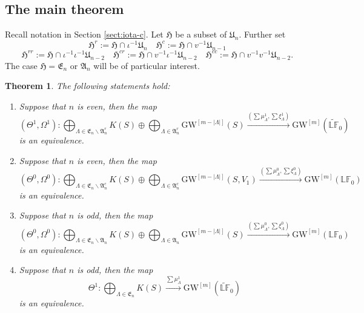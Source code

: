 \documentclass[a4paper]{amsart}
\theoremstyle{plain}
\newtheorem{theorem}{Theorem}[section]
\theoremstyle{definition}
\numberwithin{equation}{section}
\newcommand{\GW}{\mathrm{GW}}
\newcommand{\LFb}{\mathbb{LF}}
\begin{document}
\subsection{The main theorem}
Recall notation in Section \ref{sect:iota-c}. Let $\mathfrak{H}$ be a subset of $\mathfrak{U}_n$. Further set
\[\mathfrak{H}^r :=\mathfrak{H}\cap \iota^{-1}\mathfrak{U}_n  \quad \mathfrak{H}^c :=  \mathfrak{H} \cap v^{-1}\mathfrak{U}_{n-1}  \]
\[ \mathfrak{H}^{rr} :=\mathfrak{H}\cap \iota^{-1}\iota^{-1}\mathfrak{U}_{n-2} \quad \mathfrak{H}^{cr} :=\mathfrak{H}\cap v^{-1}\iota^{-1}\mathfrak{U}_{n-2} \quad \mathfrak{H}^{cc} :=\mathfrak{H}\cap v^{-1}v^{-1}\mathfrak{U}_{n-2}. \]
The case $\mathfrak{H}= \mathfrak{E}_{n}$ or $\mathfrak{A}_n$ will be of particular interest.
\begin{theorem}\label{thm:main-theo} The following statements hold:
    \begin{enumerate}[leftmargin=20pt,label={\rm (\alph*)},ref=(\alph*)]
        \item Suppose that $n$ is even, then the map
              \[   (\Theta^1, \Omega^1): \bigoplus_{\Lambda \in \mathfrak{E}_n \backslash \mathfrak{A}_n^r } K(S) \oplus \bigoplus_{\Lambda \in \mathfrak{A}_{n}^r} \GW^{[m-|\Lambda|]}(S) \xrightarrow{ (\sum \mu_\Lambda^1, \sum\xi^1_\Lambda)} \GW^{[m]}(\widetilde{\LFb}_0)
              \]
              is an equivalence.
        \item Suppose that $n$ is even, then the map
              \[
                  (\Theta^0, \Omega^0): \bigoplus_{\Lambda \in \mathfrak{E}_n \backslash \mathfrak{A}_n^c } K(S) \oplus \bigoplus_{\Lambda \in \mathfrak{A}_{n}^c} \GW^{[m-|\Lambda|]}(S, V_1) \xrightarrow{ (\sum \mu_\Lambda^0, \sum \xi_\Lambda^0)} \GW^{[m]}(\LFb_0)
              \]
              is an equivalence.
        \item Suppose that $n$ is odd, then the map
              \[
                  (\Theta^0, \Omega^0): \bigoplus_{\Lambda \in \mathfrak{E}_n \backslash \mathfrak{A}_n} K(S) \oplus \bigoplus_{\Lambda \in \mathfrak{A}_n} \GW^{[m-|\Lambda|]}(S) \xrightarrow{ (\sum \mu_\Lambda^0, \sum \xi_\Lambda^0)} \GW^{[m]}(\mathbb{LF}_0)
              \]
              is an equivalence.
        \item Suppose that $n$ is odd, then the map
              \[
                  \Theta^1: \bigoplus_{\Lambda \in \mathfrak{E}_n } K(S) \xrightarrow{ \sum \mu_\Lambda^1} \GW^{[m]}(\widetilde{\mathbb{LF}}_0)
              \]
              is an equivalence.
    \end{enumerate}
\end{theorem}
\end{document}
